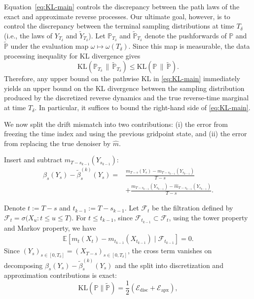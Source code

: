 \documentclass[11pt]{article}
\theoremstyle{definition}
\numberwithin{equation}{section}
\begin{document}
Equation~\eqref{eq:KL-main} controls the discrepancy between the path laws of the exact and approximate reverse processes. 
Our ultimate goal, however, is to control the discrepancy between the terminal sampling distributions at time $T_\delta$ (i.e., the laws of $Y_{T_\delta}$ and $\tilde Y_{T_\delta}$).
Let $\mathbb{P}_{T_\delta}$ and $\tilde{\mathbb{P}}_{T_\delta}$ denote the pushforwards of $\mathbb{P}$ and $\tilde{\mathbb{P}}$ under the evaluation map $\omega\mapsto \omega(T_\delta)$.
Since this map is measurable, the data processing inequality for KL divergence gives
\[
\mathrm{KL}(\mathbb{P}_{T_\delta}\,\|\,\tilde{\mathbb{P}}_{T_\delta})
\le
\mathrm{KL}(\mathbb{P}\,\|\,\tilde{\mathbb{P}}).
\]
Therefore, any upper bound on the pathwise KL in \eqref{eq:KL-main} immediately yields an upper bound on the KL divergence between the sampling distribution produced by the discretized reverse dynamics and the true reverse-time marginal at time $T_\delta$.
In particular, it suffices to bound the right-hand side of \eqref{eq:KL-main}.


We now split the drift mismatch into two contributions: (i) the error from freezing the time index and using the previous gridpoint state, and (ii) the error from replacing the true denoiser by $\hat m$.

Insert and subtract $m_{T-s_{k-1}}(Y_{s_{k-1}})$:
\begingroup
\small
\begin{align*}
\beta_s(Y_s)-\tilde\beta^{(k)}_s(Y_s)
= & \frac{m_{T-s}(Y_s)-m_{T-s_{k-1}}(Y_{s_{k-1}})}{T-s} \\
& + \frac{m_{T-s_{k-1}}(Y_{s_{k-1}})-\hat m_{T-s_{k-1}}(Y_{s_{k-1}})}{T-s}.
\end{align*}
\endgroup

Denote $t:=T-s$ and $t_{k-1}:=T-s_{k-1}$. Let $\mathcal F_{t}$ be the filtration defined by $\mathcal{F}_t = \sigma\bigl( X_u : t \leq u \leq T \bigr)$. 
For $t\le t_{k-1}$, since $\mathcal F_{{t_{k-1}}}\subset\mathcal F_t$, using the tower property and Markov property, we have
\begin{align*}
\mathbb E\!\left[m_t(X_t)-m_{t_{k-1}}(X_{t_{k-1}})\mid \mathcal F_{{t_{k-1}}}\right]
= 0.
\end{align*}
Since $(Y_s)_{s\in[0,T_\delta]} = (X_{T-s})_{s\in[0,T_\delta]}$, the cross term vanishes on decomposing $\beta_s(Y_s)-\tilde\beta^{(k)}_s(Y_s)$ and the split into discretization and approximation contributions is exact: 
\begin{equation}
\mathrm{KL}(\mathbb{P}\|\tilde{\mathbb{P}})
= \frac{1}{2 } ( \mathcal{E}_{\mathrm{disc}} + \mathcal{E}_{\mathrm{apx}}),
\label{eq:KL-split}
\end{equation}
\end{document}
